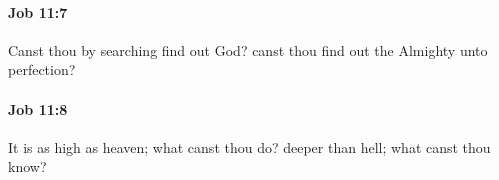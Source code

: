 		\paragraph{Job 11:7} %
			\label{JOB-11-7}

			Canst thou by searching find out God? canst thou find out the Almighty unto perfection?


		\paragraph{Job 11:8} %
			\label{JOB-11-8}

			It is as high as heaven; what canst thou do? deeper than hell; what canst thou know?


